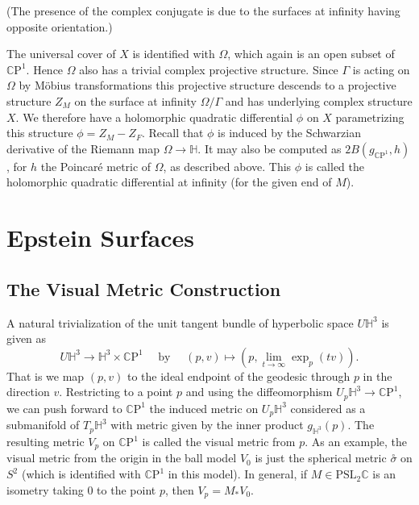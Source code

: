 \documentclass{amsart}
\newcommand{\C}{\mathbb{C}}
\newcommand{\CP}{\mathbb{C}\mathrm{P}}
\renewcommand{\H}{\mathbb{H}}
\begin{document}
\noindent (The presence of the complex conjugate is due to the surfaces at infinity having opposite orientation.)

The universal cover of $X$ is identified with $\Omega$, which again is an open subset of $\CP^1$. 
Hence $\Omega$ also has a trivial complex projective structure. Since $\Gamma$ is acting on $\Omega$ by M\"obius transformations this projective structure descends to a projective structure $Z_M$ on the surface at infinity $\Omega/\Gamma$ and has underlying complex structure $X$. 
We therefore have a holomorphic quadratic differential $\phi$ on $X$ parametrizing this structure $\phi = Z_M - Z_F$. 
Recall that $\phi$ is induced by the Schwarzian derivative of the Riemann map $\Omega \to \H$. 
It may also be computed as $2B(g_{\CP^1},h)$, for $h$ the Poincar\'e metric of $\Omega$, as described above. 
This $\phi$ is called the holomorphic quadratic differential at infinity (for the given end of $M$).



\section{Epstein Surfaces}



\subsection{The Visual Metric Construction}


A natural trivialization of the unit tangent bundle of hyperbolic space $U\H^3$ is given as
\[
U\H^3 \to \H^3 \times \CP^1
\quad \text{ by } \quad
(p,v) \mapsto (p, \lim_{t \to \infty} \exp_p (tv) ).
\]
That is we map $(p,v)$ to the ideal endpoint of the geodesic through $p$ in the direction $v$. 
Restricting to a point $p$ and using the diffeomorphism $U_p\H^3 \to \CP^1$, we can push forward to $\CP^1$ the induced metric on $U_p\H^3$ considered as a submanifold of $T_p\H^3$ with metric given by the inner product $g_{\H^3}(p)$. 
The resulting metric $V_p$ on $\CP^1$ is called the visual metric from $p$.
As an example, the visual metric from the origin in the ball model $V_0$ is just the spherical metric $\overset{\circ}{\sigma}$ on $S^2$ (which is identified with $\CP^1$ in this model). 
In general, if $M \in \mathrm{PSL}_2\C$ is an isometry taking $0$ to the point $p$, then $V_p = M_*V_0$. 
\end{document}
